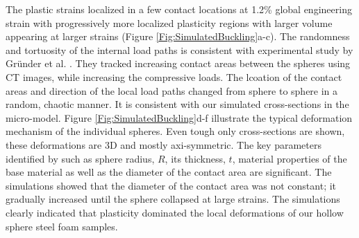 \documentclass[review]{elsarticle}
\begin{document}
{The plastic strains localized in a few contact locations at 1.2\% global engineering strain with progressively more localized plasticity regions with larger volume appearing at larger strains (Figure \ref{Fig:SimulatedBuckling}a-c). The randomness and tortuosity of the internal load paths is consistent with experimental study by Gründer et al. \cite{grunder_modeling_2001}. They tracked increasing contact areas between the spheres using CT images, while increasing the compressive loads. The lcoation of the contact areas and direction of the local load paths changed from sphere to sphere in a random, chaotic manner. It is consistent with our simulated cross-sections in the micro-model. Figure \ref{Fig:SimulatedBuckling}d-f illustrate the typical deformation mechanism of the individual spheres. Even tough only cross-sections are shown, these deformations are 3D and mostly axi-symmetric. The key parameters identified by \cite{Fallet2008} such as sphere radius, $R$, its thickness, $t$, material properties of the base material as well as the diameter of the contact area are significant. The simulations showed that the diameter of the contact area was not constant; it gradually increased until the sphere collapsed at large strains. The simulations clearly indicated that plasticity dominated the local deformations of our hollow sphere steel foam samples.


}
\end{document}

